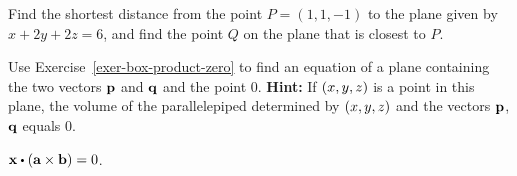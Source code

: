 \begin{enumialphparenastyle}
\begin{ex}
  Find the shortest distance from the point $P = (1,1,-1)$ to the plane
  given by $x + 2y + 2z = 6$, and find the point $Q$ on the plane
  that is closest to $P$.
\end{ex}

\begin{ex}
  Use Exercise~\ref{exer-box-product-zero} to find an equation of a
  plane containing the two vectors $\mbox{\bf p}$ and $\mbox{\bf q}$ and the
  point $0$. \textbf{Hint:} If $\left(x,y,z\right)$ is a point in this
  plane, the volume of the parallelepiped determined by $\left(x,y,z\right)$
  and the vectors $\mbox{\bf p}$, $\mbox{\bf q}$ equals 0.
  \begin{sol}
    $\vect{x}\dotprod \tup{\vect{a}\times \vect{b}} =0$.
  \end{sol}
\end{ex}

\end{enumialphparenastyle}
